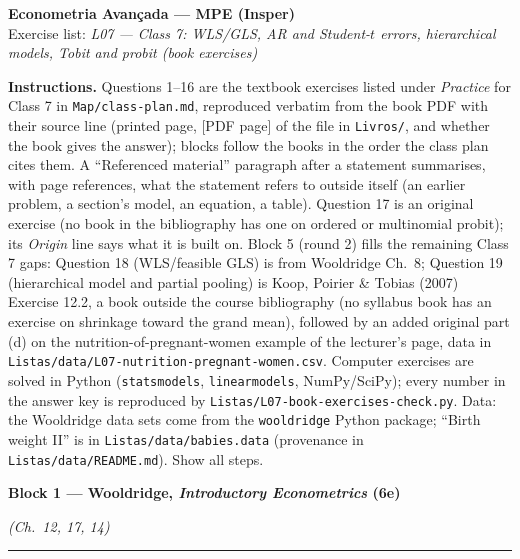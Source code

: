 \documentclass[11pt,a4paper]{article}
\newif\ifsolucoes
\newcommand{\disciplina}{Econometria Avançada --- MPE (Insper)}
\newcommand{\listatema}{\textit{L07 --- Class 7: WLS/GLS, AR and Student-$t$ errors, hierarchical models, Tobit and probit (book exercises)}}
\numberwithin{equation}{questao}
\newcommand{\bloco}[3]{\bigskip\noindent
  {\large\bfseries\color{blue!55!black}Block #1 --- #2}\par\noindent\hfill\textit{(#3)}\par
  \noindent\rule{\linewidth}{0.3pt}\smallskip}
\begin{document}
\begin{center}
  {\Large\bfseries \disciplina}\\[2pt]
  {\large Exercise list: \listatema}\ifsolucoes\\[2pt]\textit{Solutions and rubric}\fi
\end{center}
\vspace{2pt}

{\footnotesize\noindent\textbf{Instructions.} Questions 1--16 are the textbook exercises listed under
\emph{Practice} for Class 7 in \texttt{Map/class-plan.md}, reproduced verbatim from the book PDF
with their source line (printed page, [PDF page] of the file in \texttt{Livros/}, and whether the book
gives the answer); blocks follow the books in the order the class plan cites them. A
``Referenced material'' paragraph after a statement summarises, with page references, what the
statement refers to outside itself (an earlier problem, a section's model, an equation, a table).
Question 17 is an original exercise (no book in the bibliography has one on ordered or multinomial
probit); its \emph{Origin} line says what it is built on. Block 5 (round 2) fills the remaining Class 7 gaps:
Question 18 (WLS/feasible GLS) is from Wooldridge Ch.~8; Question 19 (hierarchical model and partial pooling) is
Koop, Poirier \& Tobias (2007) Exercise 12.2, a book outside the course bibliography (no syllabus book has an exercise
on shrinkage toward the grand mean), followed by an added original part (d) on the nutrition-of-pregnant-women
example of the lecturer's page, data in \texttt{Listas/data/L07-nutrition-pregnant-women.csv}.
Computer exercises are solved in Python (\texttt{statsmodels}, \texttt{linearmodels}, NumPy/SciPy);
every number in the answer key is reproduced by \texttt{Listas/L07-book-exercises-check.py}. Data:
the Wooldridge data sets come from the \texttt{wooldridge} Python package; ``Birth weight II'' is in
\texttt{Listas/data/babies.data} (provenance in \texttt{Listas/data/README.md}). Show all steps.\par}

\bloco{1}{Wooldridge, \textit{Introductory Econometrics} (6e)}{Ch.~12, 17, 14}
\end{document}
